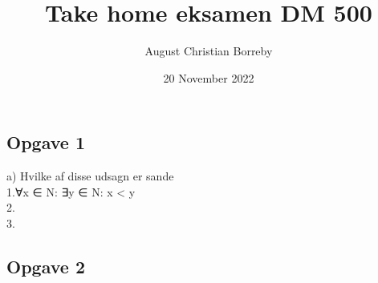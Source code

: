 \documentclass{article}
\title{Take home eksamen DM 500}
\author{August Christian Borreby}
\date{20 November 2022}
\begin{document}
\maketitle
\subsection{Opgave 1}
a) Hvilke af disse udsagn er sande \\
    1.∀x ∈ N: ∃y ∈ N: x < y \\
    2. \\
    3. \\

\subsection{Opgave 2
}








    
\end{document}
